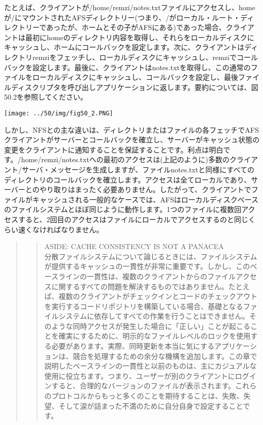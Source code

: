 たとえば、クライアントが/home/remzi/notes.txtファイルにアクセスし、homeが/にマウントされたAFSディレクトリー(つまり、/がローカル・ルート・ディレクトリーであったが、ホームとその子がAFSにある)であった場合、クライアントは最初にhomeのディレクトリ内容を取得し、それらをローカルディスクにキャッシュし、ホームにコールバックを設定します。次に、クライアントはディレクトリremziをフェッチし、ローカルディスクにキャッシュし、remziでコールバックを設定します。最後に、クライアントはnotes.txtを取得し、この通常のファイルをローカルディスクにキャッシュし、コールバックを設定し、最後ファイルディスクリプタを呼び出しアプリケーションに返します。要約については、図50.2を参照してください。

\texttt{[image: ../50/img/fig50\_2.PNG]}

しかし、NFSとの主な違いは、ディレクトリまたはファイルの各フェッチでAFSクライアントがサーバーとコールバックを確立し、サーバーがキャッシュ状態の変更をクライアントに通知することを保証することです。利点は明白です。/home/remzi/notes.txtへの最初のアクセスは(上記のように)多数のクライアント/サーバ・メッセージを生成しますが、ファイルnotes.txtと同様にすべてのディレクトリのコールバックを確立します。アクセスは全てローカルであり、サーバーとのやり取りはまったく必要ありません。したがって、クライアントでファイルがキャッシュされる一般的なケースでは、AFSはローカルディスクベースのファイルシステムとほぼ同じように動作します。1つのファイルに複数回アクセスすると、2回目のアクセスはファイルにローカルでアクセスするのと同じくらい速くなければなりません。

\begin{quote}
\begin{quote}
ASIDE: CACHE CONSISTENCY IS NOT A PANACEA\\
分散ファイルシステムについて論じるときには、ファイルシステムが提供するキャッシュの一貫性が非常に重要です。しかし、このベースラインの一貫性は、複数のクライアントからのファイルアクセスに関するすべての問題を解決するものではありません。たとえば、複数のクライアントがチェックインとコードのチェックアウトを実行するコードリポジトリを構築している場合、基礎となるファイルシステムに依存してすべての作業を行うことはできません。そのような同時アクセスが発生した場合に「正しい」ことが起こることを確実にするために、明示的なファイルレベルのロックを使用する必要があります。実際、同時更新を本当に気にするアプリケーションは、競合を処理するための余分な機構を追加します。この章で説明したベースラインの一貫性と以前のものは、主にカジュアルな使用に役立ちます。つまり、ユーザーが別のクライアントにログインすると、合理的なバージョンのファイルが表示されます。これらのプロトコルからもっと多くのことを期待することは、失敗、失望、そして涙が詰まった不満のために自分自身で設定することです。
\end{quote}
\end{quote}

